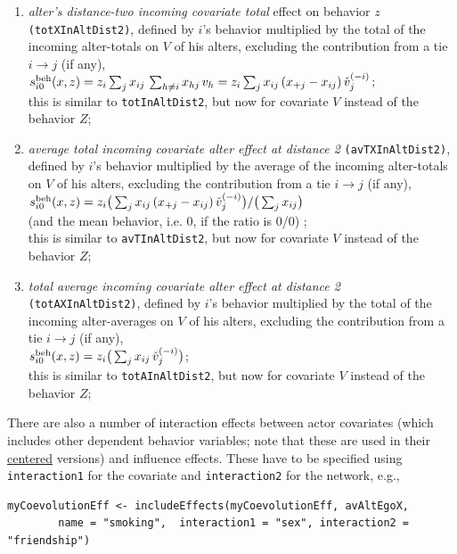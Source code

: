 \documentclass[a4paper,fleqn,11pt]{article}
\newcommand{\+}{\, + \,}
\newcommand{\vit}{\theenumi}
\newcounter{savenumi}
\begin{document}
\begin{enumerate}
 \item {\em alter's distance-two incoming covariate total} effect on behavior $z$ \texttt{(totXInAltDist2)},
 defined by  $i$'s
 behavior multiplied by the total of the incoming alter-totals on $V$ of his alters,
 excluding the contribution from a tie $i \rightarrow j$ (if any),\\
 $s^{\rm beh}_{i\vit}(x, z) = z_i \sum_j x_{ij}\, \sum_{h \neq i} x_{hj}\,v_h =
         z_i \sum_j x_{ij}\, (x_{+j}- x_{ij}) \, \check v_j^{(-i)}  $;\\[0.5ex]
 this is similar to \texttt{totInAltDist2}, but now for covariate $V$
 instead of the behavior $Z$;

 \item {\em average total incoming covariate alter effect at distance 2} \texttt{(avTXInAltDist2)},
 defined by  $i$'s
 behavior multiplied by the average of the incoming alter-totals on $V$ of his alters,
 excluding the contribution from a tie $i \rightarrow j$ (if any),\\[0.3ex]
 $s^{\rm beh}_{i\vit}(x, z) =  z_i \big( \sum_j x_{ij}\,(x_{+j}- x_{ij}) \, \check v_j^{(-i)} \big)
                                / \big (\sum_j x_{ij}\big)  $\\[0.5ex]
 (and the mean behavior, i.e. $0$, if the ratio is 0/0) ;\\
 this is similar to \texttt{avTInAltDist2}, but now for covariate $V$
 instead of the behavior $Z$;

 \item {\em total average incoming covariate alter effect at distance 2} \texttt{(totAXInAltDist2)},
 defined by  $i$'s
 behavior multiplied by the total of the incoming alter-averages on $V$ of his alters,
 excluding the contribution from a tie $i \rightarrow j$ (if any), \\[0.3ex]
 $s^{\rm beh}_{i\vit}(x, z) =  z_i \big( \sum_j x_{ij}\, \check v_j^{(-i)} \big) $;\\[0.5ex]
 this is similar to \texttt{totAInAltDist2}, but now for covariate $V$
 instead of the behavior $Z$;

\setcounter{savenumi}{\value{enumi}}
\end{enumerate}
There are also a number of interaction effects between actor covariates
(which includes other dependent behavior variables; note that these are used
in their \underline{centered} versions) and influence effects.
These have to be specified using \texttt{interaction1} for the covariate
and \texttt{interaction2} for the network, e.g.,
\begin{verbatim}
myCoevolutionEff <- includeEffects(myCoevolutionEff, avAltEgoX,
        name = "smoking",  interaction1 = "sex", interaction2 = "friendship")
\end{verbatim}
\end{document}
